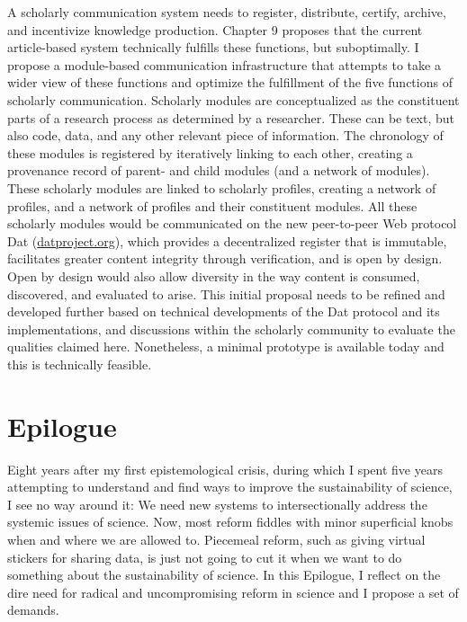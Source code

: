 \documentclass[a5paper]{book}
\begin{document}
A scholarly communication system needs to register, distribute, certify,
archive, and incentivize knowledge production. Chapter 9 proposes that
the current article-based system technically fulfills these functions,
but suboptimally. I propose a module-based communication infrastructure
that attempts to take a wider view of these functions and optimize the
fulfillment of the five functions of scholarly communication. Scholarly
modules are conceptualized as the constituent parts of a research
process as determined by a researcher. These can be text, but also code,
data, and any other relevant piece of information. The chronology of
these modules is registered by iteratively linking to each other,
creating a provenance record of parent- and child modules (and a network
of modules). These scholarly modules are linked to scholarly profiles,
creating a network of profiles, and a network of profiles and their
constituent modules. All these scholarly modules would be communicated
on the new peer-to-peer Web protocol Dat
(\href{https://datproject.org}{datproject.org}), which provides a
decentralized register that is immutable, facilitates greater content
integrity through verification, and is open by design. Open by design
would also allow diversity in the way content is consumed, discovered,
and evaluated to arise. This initial proposal needs to be refined and
developed further based on technical developments of the Dat protocol
and its implementations, and discussions within the scholarly community
to evaluate the qualities claimed here. Nonetheless, a minimal prototype
is available today and this is technically feasible.

\chapter*{Epilogue}\label{epilogue}

Eight years after my first epistemological crisis, during which I spent
five years attempting to understand and find ways to improve the
sustainability of science, I see no way around it: We need new systems
to intersectionally address the systemic issues of science. Now, most
reform fiddles with minor superficial knobs when and where we are
allowed to. Piecemeal reform, such as giving virtual stickers for
sharing data, is just not going to cut it when we want to do something
about the sustainability of science. In this Epilogue, I reflect on the
dire need for radical and uncompromising reform in science and I propose
a set of demands.
\end{document}
